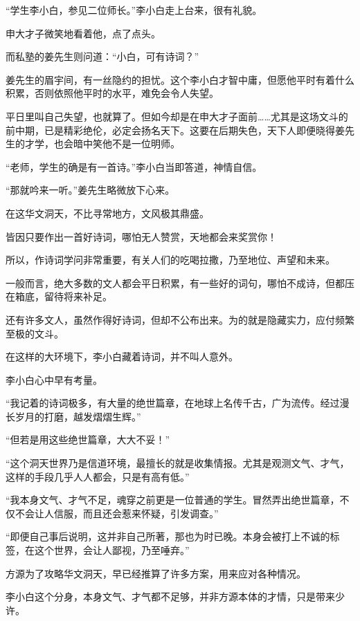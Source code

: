 
\begin{this_body}

“学生李小白，参见二位师长。”李小白走上台来，很有礼貌。

申大才子微笑地看着他，点了点头。

而私塾的姜先生则问道：“小白，可有诗词？”

姜先生的眉宇间，有一丝隐约的担忧。这个李小白才智中庸，但愿他平时有着什么积累，否则依照他平时的水平，难免会令人失望。

平日里叫自己失望，也就算了。但如今却是在申大才子面前……尤其是这场文斗的前中期，已是精彩绝伦，必定会扬名天下。这要在后期失色，天下人即便晓得姜先生的才学，也会暗中笑他不是一位明师。

“老师，学生的确是有一首诗。”李小白当即答道，神情自信。

“那就吟来一听。”姜先生略微放下心来。

在这华文洞天，不比寻常地方，文风极其鼎盛。

皆因只要作出一首好诗词，哪怕无人赞赏，天地都会来奖赏你！

所以，作诗词学问非常重要，有关人们的吃喝拉撒，乃至地位、声望和未来。

一般而言，绝大多数的文人都会平日积累，有一些好的词句，哪怕不成诗，但都压在箱底，留待将来补足。

还有许多文人，虽然作得好诗词，但却不公布出来。为的就是隐藏实力，应付频繁至极的文斗。

在这样的大环境下，李小白藏着诗词，并不叫人意外。

李小白心中早有考量。

“我记着的诗词极多，有大量的绝世篇章，在地球上名传千古，广为流传。经过漫长岁月的打磨，越发熠熠生辉。”

“但若是用这些绝世篇章，大大不妥！”

“这个洞天世界乃是信道环境，最擅长的就是收集情报。尤其是观测文气、才气，这样的手段几乎人人都会，只是有高有低。”

“我本身文气、才气不足，魂穿之前更是一位普通的学生。冒然弄出绝世篇章，不仅不会让人信服，而且还会惹来怀疑，引发调查。”

“即便自己事后说明，这并非自己所著，那也为时已晚。本身会被打上不诚的标签，在这个世界，会让人鄙视，乃至唾弃。”

方源为了攻略华文洞天，早已经推算了许多方案，用来应对各种情况。

李小白这个分身，本身文气、才气都不足够，并非方源本体的才情，只是带来少许。


\end{this_body}
